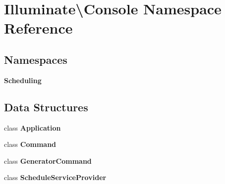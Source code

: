 \section{Illuminate\textbackslash{}Console Namespace Reference}
\label{namespace_illuminate_1_1_console}
\subsection*{Namespaces}
\begin{DoxyCompactItemize}
\item 
 {\bf Scheduling}
\end{DoxyCompactItemize}
\subsection*{Data Structures}
\begin{DoxyCompactItemize}
\item 
class {\bf Application}
\item 
class {\bf Command}
\item 
class {\bf Generator\+Command}
\item 
class {\bf Schedule\+Service\+Provider}
\end{DoxyCompactItemize}
